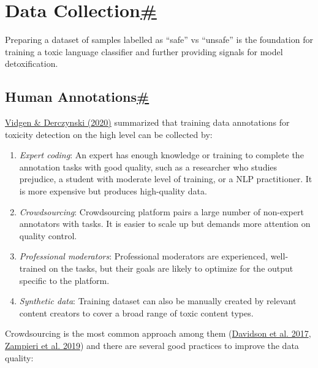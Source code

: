 \section{\texorpdfstring{Data Collection\hyperref[data-collection]{\#}}{Data Collection\#}}\label{data-collection}

Preparing a dataset of samples labelled as ``safe'' vs ``unsafe'' is the foundation for training a toxic language classifier and further providing signals for model detoxification.

\subsection{\texorpdfstring{Human Annotations\hyperref[human-annotations]{\#}}{Human Annotations\#}}\label{human-annotations}

\href{https://arxiv.org/abs/2004.01670}{Vidgen \& Derczynski (2020)} summarized that training data annotations for toxicity detection on the high level can be collected by:

\begin{enumerate}
\tightlist
\item
  \emph{Expert coding}: An expert has enough knowledge or training to complete the annotation tasks with good quality, such as a researcher who studies prejudice, a student with moderate level of training, or a NLP practitioner. It is more expensive but produces high-quality data.
\item
  \emph{Crowdsourcing}: Crowdsourcing platform pairs a large number of non-expert annotators with tasks. It is easier to scale up but demands more attention on quality control.
\item
  \emph{Professional moderators}: Professional moderators are experienced, well-trained on the tasks, but their goals are likely to optimize for the output specific to the platform.
\item
  \emph{Synthetic data}: Training dataset can also be manually created by relevant content creators to cover a broad range of toxic content types.
\end{enumerate}

Crowdsourcing is the most common approach among them (\href{https://arxiv.org/abs/1703.04009}{Davidson et al. 2017}, \href{https://arxiv.org/abs/1902.09666}{Zampieri et al. 2019}) and there are several good practices to improve the data quality:


